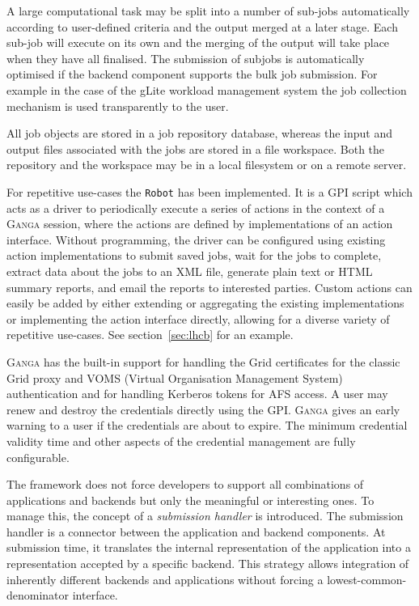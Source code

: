 \documentclass{elsart}
\def\ganga {\textsc{Ganga}\xspace}
\def\grid {Grid\xspace}
\def\GPI{GPI\xspace}
\newcommand{\code}[1]{\texttt{#1}}
\begin{document}
A large computational task may be split into a number of sub-jobs
automatically according to user-defined criteria and the output merged
at a later stage. Each sub-job will execute on its own and the merging
of the output will take place when they have all finalised. The
submission of subjobs is automatically optimised if the backend
component supports the bulk job submission. For example in the case of
the gLite \cite{LCG} workload management system the job collection
mechanism is used transparently to the user.

All job objects are stored in a job repository database, whereas the input
and output files associated with the jobs are stored in a file workspace. Both
the repository and the workspace may be in a local filesystem or on a remote
server.

For repetitive use-cases the \code{Robot} has been implemented. It is a \GPI
script which acts as a driver to periodically execute a series of
actions in the context of a \ganga session, where the actions are defined by
implementations of an action interface.  Without programming, the driver can be
configured using existing action implementations to submit saved jobs, wait
for the jobs to complete, extract data about the jobs to an XML file, generate
plain text or HTML summary reports, and email the reports to interested
parties. Custom actions can easily be added by either extending or aggregating
the existing implementations or implementing the action interface directly,
allowing for a diverse variety of repetitive use-cases. See
section~\ref{sec:lhcb} for an example.


\ganga has the built-in support for handling the \grid certificates for
the classic \grid proxy and VOMS (Virtual Organisation Management
System) \cite{VOMS} authentication and for handling Kerberos\cite{Kerberos} tokens
for AFS \cite{AFS} access. A user may renew and destroy the
credentials directly using the GPI. \ganga gives an early warning to a
user if the credentials are about to expire. The minimum credential
validity time and other aspects of the credential management are fully
configurable.

The framework does not force developers to support all combinations of
applications and backends but only the meaningful or interesting ones. To manage
this, the concept of a {\em submission handler} is introduced. The submission
handler is a connector between the application and backend components. At
submission time, it translates the internal representation of the application
into a representation accepted by a specific backend. This strategy allows
integration of inherently different backends and applications without forcing
a lowest-common-denominator interface.
\end{document}
